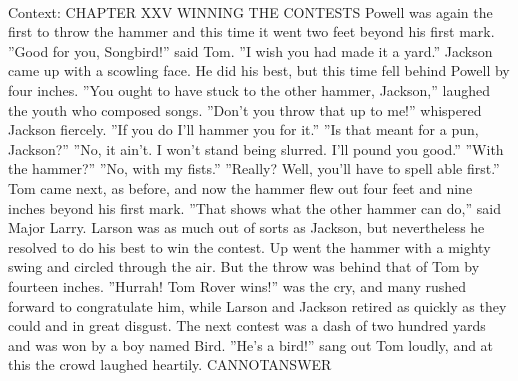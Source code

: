 \documentclass[11pt,a4paper, onecolumn]{article}
\begin{document}
\\ Context: CHAPTER XXV WINNING THE CONTESTS Powell was again the first to throw the hammer and this time it went two feet beyond his first mark. ''Good for you, Songbird!'' said Tom. ''I wish you had made it a yard.'' Jackson came up with a scowling face. He did his best, but this time fell behind Powell by four inches. ''You ought to have stuck to the other hammer, Jackson,'' laughed the youth who composed songs. ''Don't you throw that up to me!'' whispered Jackson fiercely. ''If you do I'll hammer you for it.'' ''Is that meant for a pun, Jackson?'' ''No, it ain't. I won't stand being slurred. I'll pound you good.'' ''With the hammer?'' ''No, with my fists.'' ''Really? Well, you'll have to spell able first.'' Tom came next, as before, and now the hammer flew out four feet and nine inches beyond his first mark. ''That shows what the other hammer can do,'' said Major Larry. Larson was as much out of sorts as Jackson, but nevertheless he resolved to do his best to win the contest. Up went the hammer with a mighty swing and circled through the air. But the throw was behind that of Tom by fourteen inches. ''Hurrah! Tom Rover wins!'' was the cry, and many rushed forward to congratulate him, while Larson and Jackson retired as quickly as they could and in great disgust. The next contest was a dash of two hundred yards and was won by a boy named Bird. ''He's a bird!'' sang out Tom loudly, and at this the crowd laughed heartily. CANNOTANSWER
\end{document}
